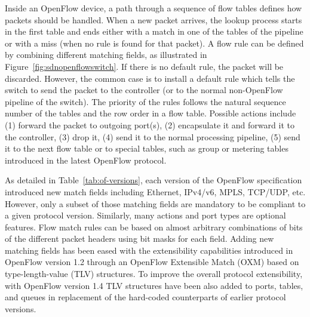 Inside an OpenFlow device, a path through a sequence of flow tables defines how packets should be handled. 
When a new packet arrives, the lookup process starts in the first table and ends either with a match in one of the tables of the pipeline 
or with a miss (when no rule is found for that packet). 
A flow rule can be defined by combining different matching fields, as illustrated in Figure~\ref{fig:sdnopenflowswitch}.
If there is no default 
rule, the packet will be discarded. However, the common case is to install a default rule which tells the switch to send the packet to the controller (or to the normal non-OpenFlow pipeline of the switch). The priority  of the rules follows the natural sequence number of the tables and the row order in a 
flow table. Possible actions include (1) forward the packet to outgoing port(s), (2) 
encapsulate it and forward it to the controller, (3) drop it, (4) send it to the 
normal processing pipeline, (5) send it to the next flow table or to special tables, such as group or metering tables introduced in the latest OpenFlow protocol.

As detailed in Table~\ref{tab:of-versions}, each version of the OpenFlow specification introduced new match fields including Ethernet, IPv4/v6, MPLS, TCP/UDP, etc. However, only a subset of those matching fields are mandatory to be compliant to a given protocol version. Similarly, many actions and port types are optional features. 
Flow match rules can be based on almost arbitrary combinations of bits of the different packet headers using bit masks for each field. Adding new matching fields has been eased with the extensibility capabilities introduced in OpenFlow version 1.2 through an OpenFlow Extensible Match (OXM) based on type-length-value (TLV) structures. To improve the overall protocol extensibility, with OpenFlow version 1.4 TLV structures have been also added to  ports, tables, and queues in replacement of the hard-coded counterparts of earlier protocol versions. 



